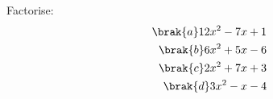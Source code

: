 Factorise:
\begin{align}
\brak{a} 12x^{2} - 7x + 1
\\
\brak{b} 6x^{2} + 5x - 6
\\
\brak{c} 2x^{2} + 7x + 3
\\
\brak{d} 3x^{2} - x - 4
\end{align}
